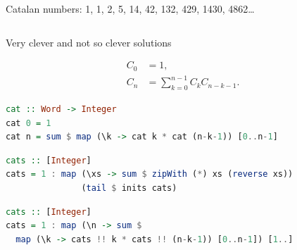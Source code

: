 \documentclass[handout]{beamer}
\def\catalanEq{
\begin{align*}
C_0 &= 1, \\
C_n &= \sum_{k=0}^{n-1} C_k C_{n-k-1}.
\end{align*}
}
\begin{document}
\begin{frame}[fragile]{Catalan numbers: 1, 1, 2, 5, 14, 42, 132, 429, 1430, 4862\dots}
\begin{columns}[T]
\end{columns}

\end{frame}

\begin{frame}[fragile]{Very clever and not so clever solutions}

\catalanEq

\begin{lstlisting}[language=Haskell]
cat :: Word -> Integer
cat 0 = 1
cat n = sum $ map (\k -> cat k * cat (n-k-1)) [0..n-1]
\end{lstlisting}

\begin{lstlisting}[language=Haskell]
cats :: [Integer]
cats = 1 : map (\xs -> sum $ zipWith (*) xs (reverse xs))
               (tail $ inits cats)
\end{lstlisting}

\begin{lstlisting}[language=Haskell]
cats :: [Integer]
cats = 1 : map (\n -> sum $
  map (\k -> cats !! k * cats !! (n-k-1)) [0..n-1]) [1..]
\end{lstlisting}

\end{frame}
\end{document}
